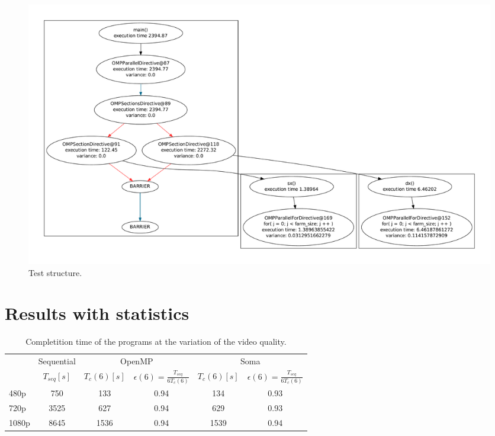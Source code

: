 \documentclass[a4paper,12pt,oneside]{book}
\begin{document}
\begin{figure}[H]
\centering
\includegraphics[scale=0.3]{functiongraphs.pdf}
\caption{Test structure.}
\label{teststructure}
\end{figure}

\section{Results with statistics}

\begin{table}
\begin{center}
\begin{tabular}{| l || c || c | c || c | c |} 
\hline
 & \multicolumn{1}{|c||}{Sequential} & \multicolumn{2}{|c||}{OpenMP} & \multicolumn{2}{|c|}{Soma} \\
\cline{2-6}
  & $T_{seq}[s]$ & $T_c(6)[s]$ & $\epsilon (6) = \frac{T_{seq}}{6T_c(6)}$ & $T_c(6)[s]$ & $\epsilon (6) = \frac{T_{seq}}{6T_c(6)}$ \\
\cline{2-6}
\hline
480p & 750 & 133 & 0.94 & 134 & 0.93 \\
\hline
720p & 3525 & 627 & 0.94 & 629 & 0.93 \\
\hline
1080p & 8645 & 1536 & 0.94 & 1539 & 0.94 \\
\hline 
\end{tabular}
\caption{Completition time of the programs at the variation of the video quality.}
\label{times}
\end{center}
\end{table}
\end{document}
